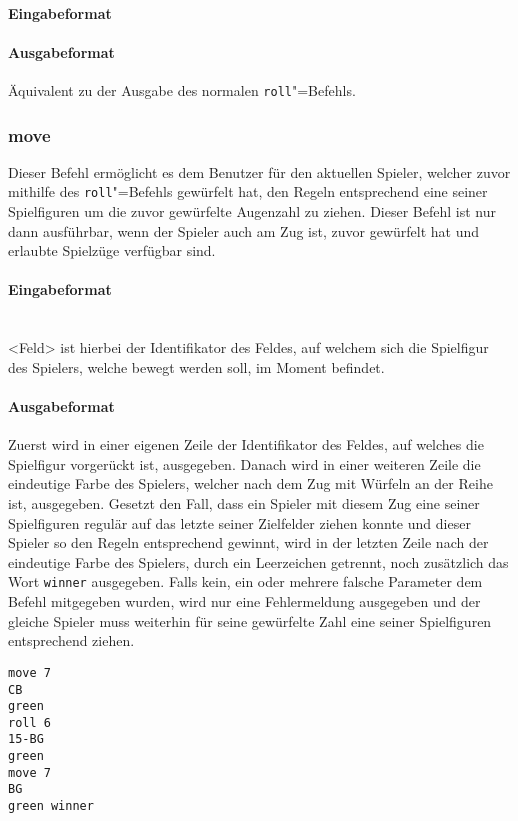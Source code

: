 \paragraph*{Eingabeformat}
\paragraph*{Ausgabeformat}
Äquivalent zu der Ausgabe des normalen \texttt{roll}"=Befehls.

\subsubsection*{move}
Dieser Befehl ermöglicht es dem Benutzer für den aktuellen Spieler, welcher zuvor mithilfe des \texttt{roll}"=Befehls gewürfelt hat, den Regeln entsprechend eine seiner Spielfiguren um die zuvor gewürfelte Augenzahl zu ziehen. Dieser Befehl ist nur dann ausführbar, wenn der Spieler auch am Zug ist, zuvor gewürfelt hat und erlaubte Spielzüge verfügbar sind.
\paragraph{Eingabeformat}
\\
<Feld> ist hierbei der Identifikator des Feldes, auf welchem sich die Spielfigur des Spielers, welche bewegt werden soll, im Moment befindet.
\paragraph{Ausgabeformat}
Zuerst wird in einer eigenen Zeile der Identifikator des Feldes, auf welches die Spielfigur vorgerückt ist, ausgegeben. Danach wird in einer weiteren Zeile die eindeutige Farbe des Spielers, welcher nach dem Zug mit Würfeln an der Reihe ist, ausgegeben.
Gesetzt den Fall, dass ein Spieler mit diesem Zug eine seiner Spielfiguren regulär auf das letzte seiner Zielfelder ziehen konnte und dieser Spieler so den Regeln entsprechend gewinnt, wird in der letzten Zeile nach der eindeutige Farbe des Spielers, durch ein Leerzeichen getrennt, noch zusätzlich das Wort \texttt{winner} ausgegeben.
Falls kein, ein oder mehrere falsche Parameter dem Befehl mitgegeben wurden, wird nur eine Fehlermeldung ausgegeben und der gleiche Spieler muss weiterhin für seine gewürfelte Zahl eine seiner Spielfiguren entsprechend ziehen.

\begin{tcolorbox}[title=Beispiel]
\begin{verbatim}
move 7
CB
green
roll 6
15-BG
green
move 7
BG
green winner
\end{verbatim}
\end{tcolorbox}

